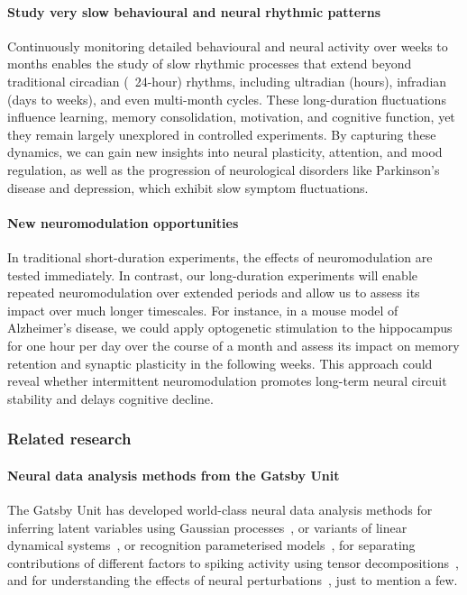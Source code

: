 \documentclass[12pt]{article}
\begin{document}
\paragraph{Study very slow behavioural and neural rhythmic patterns}
%
Continuously monitoring detailed behavioural and neural activity over weeks to
months enables the study of slow rhythmic processes that extend beyond
traditional circadian (~24-hour) rhythms, including ultradian (hours),
infradian (days to weeks), and even multi-month cycles. These long-duration
fluctuations influence learning, memory consolidation, motivation, and
cognitive function, yet they remain largely unexplored in controlled
experiments. By capturing these dynamics, we can gain new insights into neural
plasticity, attention, and mood regulation, as well as the progression of
neurological disorders like Parkinson’s disease and depression, which exhibit
slow symptom fluctuations.

\paragraph{New neuromodulation opportunities}
%
In traditional short-duration experiments, the effects of neuromodulation are
tested immediately. In contrast, our long-duration experiments will enable
repeated neuromodulation over extended periods and allow us to assess its
impact over much longer timescales.
%
For instance, in a mouse model of Alzheimer's disease, we could apply
optogenetic stimulation to the hippocampus for one hour per day over the course
of a month and assess its impact on memory retention and synaptic plasticity in
the following weeks. This approach could reveal whether intermittent
neuromodulation promotes long-term neural circuit stability and delays
cognitive decline.

\subsubsection{Related research}
\label{sec:relatedResearchOfflineAnalysis}

\paragraph{Neural data analysis methods from the Gatsby Unit}
%
The Gatsby Unit has developed world-class neural data analysis methods for
%
inferring latent variables using Gaussian
processes~\citep{yuEtAl09,dunckerAndSahani18,ruttenEtAl20,yuEtAl24}, or variants
of linear dynamical systems~\citep{buesinEtAl12,mackeEtAl15}, or recognition
parameterised models~\citep{walkerEtAl23},
%
for separating contributions of different factors to spiking activity using
tensor decompositions~\citep{soulatEtAl21},
%
and for understanding the effects of neural perturbations~\citep{oSheaEtAl22},
just to mention a few.
\end{document}
